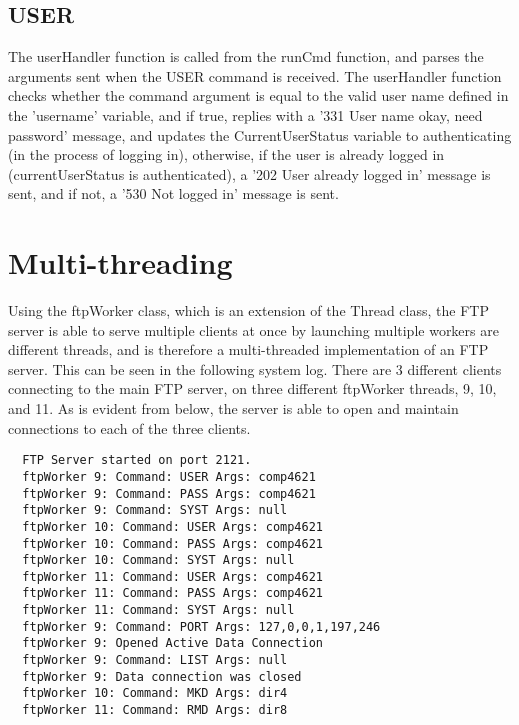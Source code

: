 \documentclass[11pt,a4paper,titlepage]{article}
\begin{document}
\subsection{USER}
The userHandler function is called from the runCmd function, and parses the arguments sent when the USER command is received. The userHandler function checks whether the command argument is equal to the valid user name defined in the 'username' variable, and if true, replies with a '331 User name okay, need password' message, and updates the CurrentUserStatus variable to authenticating (in the process of logging in), otherwise, if the user is already logged in (currentUserStatus is authenticated), a '202 User already logged in' message is sent, and if not, a '530 Not logged in' message is sent.

\section{Multi-threading}
Using the ftpWorker class, which is an extension of the Thread class, the FTP server is able to serve multiple clients at once by launching multiple workers are different threads, and is therefore a multi-threaded implementation of an FTP server. This can be seen in the following system log. There are 3 different clients connecting to the main FTP server, on three different ftpWorker threads, 9, 10, and 11. As is evident from below, the server is able to open and maintain connections to each of the three clients.

\begin{verbatim}
  FTP Server started on port 2121.
  ftpWorker 9: Command: USER Args: comp4621
  ftpWorker 9: Command: PASS Args: comp4621
  ftpWorker 9: Command: SYST Args: null
  ftpWorker 10: Command: USER Args: comp4621
  ftpWorker 10: Command: PASS Args: comp4621
  ftpWorker 10: Command: SYST Args: null
  ftpWorker 11: Command: USER Args: comp4621
  ftpWorker 11: Command: PASS Args: comp4621
  ftpWorker 11: Command: SYST Args: null
  ftpWorker 9: Command: PORT Args: 127,0,0,1,197,246
  ftpWorker 9: Opened Active Data Connection
  ftpWorker 9: Command: LIST Args: null
  ftpWorker 9: Data connection was closed
  ftpWorker 10: Command: MKD Args: dir4
  ftpWorker 11: Command: RMD Args: dir8
\end{verbatim}

\clearpage
\nocite{*}

\raggedright

\end{document}
